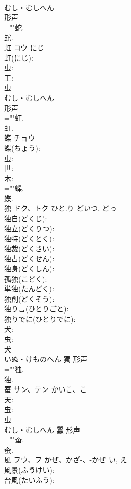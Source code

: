 \documentclass[8pt]{extreport}
\begin{document}
\begin{CJK}{UTF8}{min}
\\	むし・むしへん	
\\	形声 
\\	=""蛇.
\\	蛇.
\\	虹	コウ	にじ		
\\	虹(にじ): 
\\	虫: 
\\	工: 
\\	虫	
\\	むし・むしへん	
\\	形声 
\\	=""虹.
\\	虹.
\\	蝶	チョウ			
\\	蝶(ちょう): 
\\	虫: 
\\	世: 
\\	木: 
\\	=""蝶.
\\	蝶.
\\	独	ドク、トク	ひと.り	どいつ, どっ	
\\	独自(どくじ): 
\\	独立(どくりつ): 
\\	独特(どくとく): 
\\	独裁(どくさい): 
\\	独占(どくせん): 
\\	独身(どくしん): 
\\	孤独(こどく): 
\\	単独(たんどく): 
\\	独創(どくそう): 
\\	独り言(ひとりごと): 
\\	独りでに(ひとりでに): 
\\	犬: 
\\	虫: 
\\	犬	
\\	いぬ・けものへん	獨	形声 
\\	=""独.
\\	独.
\\	蚕	サン、テン	かいこ、こ		
\\	天: 
\\	虫: 
\\	虫	
\\	むし・むしへん	蠶	形声 
\\	=""蚕.
\\	蚕.
\\	風	フウ、フ	かぜ、かざ-、-かぜ	い, え	
\\	風景(ふうけい): 
\\	台風(たいふう): 

\end{CJK}
\end{document}
